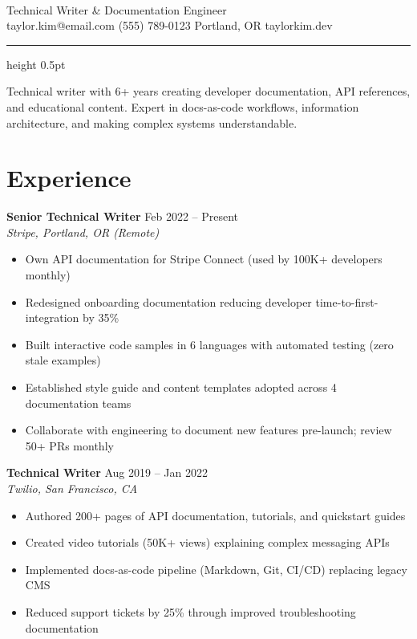 \documentclass[11pt,a4paper]{article}
\begin{document}
\\[0.1em]
{\fontsize{14}{18}\selectfont\color{gray60} Technical Writer \& Documentation Engineer}\\[0.5em]
{\small\color{gray60} taylor.kim@email.com \quad\textbar\quad (555) 789-0123 \quad\textbar\quad Portland, OR \quad\textbar\quad taylorkim.dev}

\vspace{0.8em}
{\color{gray30}\hrule height 0.5pt}
\vspace{0.5em}

{\large Technical writer with 6+ years creating developer documentation, API references, and educational content. Expert in docs-as-code workflows, information architecture, and making complex systems understandable.}

\section{Experience}

{\fontsize{12}{14}\selectfont\bfseries Senior Technical Writer} \hfill {\color{gray60}\small Feb 2022 -- Present}\\
{\color{gray60}\textit{Stripe, Portland, OR (Remote)}}
\begin{itemize}[leftmargin=1.2em,nosep,label={\color{gray60}\textbullet}]
\item Own API documentation for Stripe Connect (used by 100K+ developers monthly)
\item Redesigned onboarding documentation reducing developer time-to-first-integration by 35\%
\item Built interactive code samples in 6 languages with automated testing (zero stale examples)
\item Established style guide and content templates adopted across 4 documentation teams
\item Collaborate with engineering to document new features pre-launch; review 50+ PRs monthly
\end{itemize}
\vspace{0.6em}

{\fontsize{12}{14}\selectfont\bfseries Technical Writer} \hfill {\color{gray60}\small Aug 2019 -- Jan 2022}\\
{\color{gray60}\textit{Twilio, San Francisco, CA}}
\begin{itemize}[leftmargin=1.2em,nosep,label={\color{gray60}\textbullet}]
\item Authored 200+ pages of API documentation, tutorials, and quickstart guides
\item Created video tutorials (50K+ views) explaining complex messaging APIs
\item Implemented docs-as-code pipeline (Markdown, Git, CI/CD) replacing legacy CMS
\item Reduced support tickets by 25\% through improved troubleshooting documentation
\end{itemize}
\vspace{0.6em}
\end{document}
